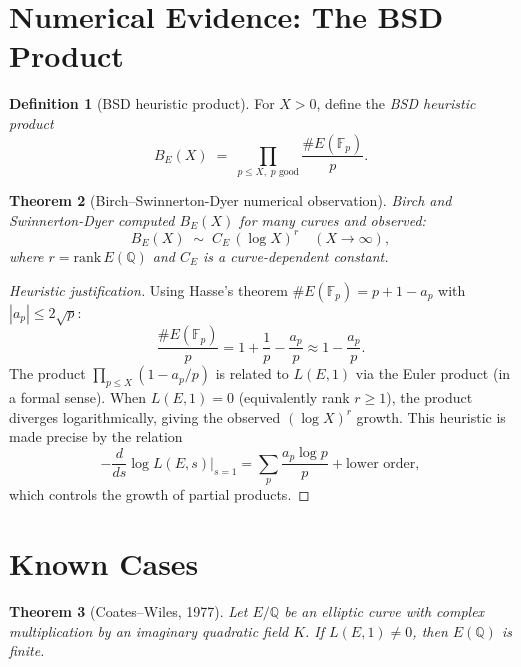 \documentclass[12pt,a4paper]{amsart}
\newtheorem{theorem}{Theorem}[section]
\theoremstyle{definition}
\newtheorem{definition}[theorem]{Definition}
\newcommand{\Q}{\mathbb{Q}}
\newcommand{\Fp}{\mathbb{F}_p}
\begin{document}
\section{Numerical Evidence: The BSD Product}

\begin{definition}[BSD heuristic product]
\label{def:bsd_product}
For $X > 0$, define the \emph{BSD heuristic product}
\[
  B_E(X) \;=\; \prod_{p \le X,\; p\text{ good}} \frac{\#E(\Fp)}{p}.
\]
\end{definition}

\begin{theorem}[Birch--Swinnerton-Dyer numerical observation]
\label{thm:bsd_numerical}
Birch and Swinnerton-Dyer \cite{BSD1965} computed $B_E(X)$ for many curves
and observed:
\[
  B_E(X) \;\sim\; C_E\,(\log X)^r \quad (X \to \infty),
\]
where $r = \mathrm{rank}\,E(\Q)$ and $C_E$ is a curve-dependent constant.
\end{theorem}

\begin{proof}[Heuristic justification]
Using Hasse's theorem $\#E(\Fp) = p + 1 - a_p$ with $|a_p| \le 2\sqrt{p}$:
\[
  \frac{\#E(\Fp)}{p} = 1 + \frac{1}{p} - \frac{a_p}{p}
  \approx 1 - \frac{a_p}{p}.
\]
The product $\prod_{p \le X}(1 - a_p/p)$ is related to $L(E,1)$ via
the Euler product (in a formal sense).
When $L(E,1) = 0$ (equivalently rank $r \ge 1$), the product diverges
logarithmically, giving the observed $(\log X)^r$ growth.
This heuristic is made precise by the relation
\[
  -\frac{d}{ds}\log L(E,s)\big|_{s=1} = \sum_p \frac{a_p \log p}{p}
  + \text{lower order},
\]
which controls the growth of partial products.
\end{proof}

\section{Known Cases}

\begin{theorem}[Coates--Wiles, 1977]
\label{thm:coates_wiles}
Let $E/\Q$ be an elliptic curve with complex multiplication by an
imaginary quadratic field $K$.  If $L(E,1) \ne 0$, then $E(\Q)$ is finite.
\end{theorem}
\end{document}
